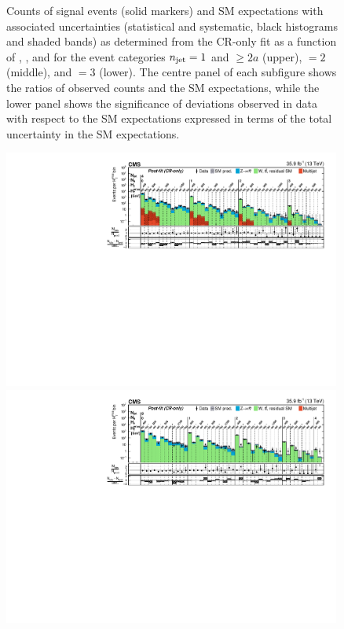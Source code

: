 \begin{figure}[!p]
  \caption{Counts of signal events (solid markers) and SM expectations
    with associated uncertainties (statistical and systematic, black
    histograms and shaded bands) as determined from the CR-only fit as
    a function of \nb, \scalht, and \mht for the event categories
    $n_{\text{jet}} = 1$ and ${\geq}2a$ (upper), $=2$ (middle), and $=3$
    (lower). The centre panel of each subfigure shows the ratios of
    observed counts and the SM expectations, while the lower panel
    shows the significance of deviations observed in data with respect
    to the SM expectations expressed in terms of the total uncertainty
    in the SM expectations.  }
  \label{fig:result1}
\end{figure}

\begin{figure}[!p]
  \centering
  \includegraphics[width=0.99\textwidth]{CMS-SUS-16-038_Figure_002-a.pdf}\\
  \includegraphics[width=0.99\textwidth]{CMS-SUS-16-038_Figure_002-b.pdf}\\

\end{figure}
